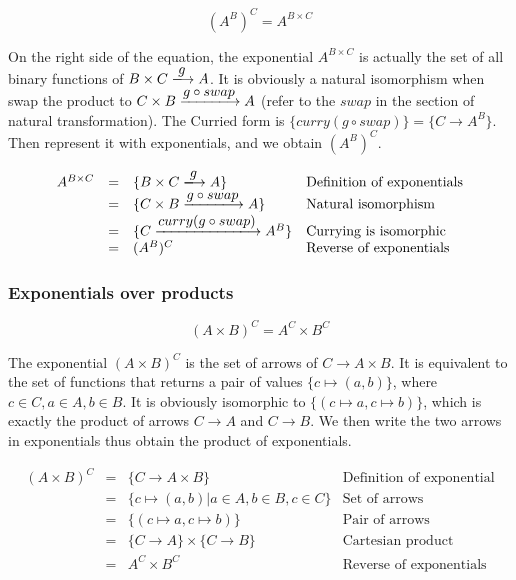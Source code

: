 \documentclass{article}
\begin{document}
\[
  (A^B)^C = A^{B \times C}
\]

On the right side of the equation, the exponential $A^{B \times C}$ is actually the set of all binary functions of $B \times C \arrowto{g} A$. It is obviously a natural isomorphism when swap the product to $C \times B \arrowto{g \circ swap} A$ (refer to the $swap$ in the section of natural transformation). The Curried form is $\{curry(g \circ swap)\} = \{C \to A^B\}$. Then represent it with exponentials, and we obtain $(A^B)^C$.

\[
\begin{array}{rcll}
A^{B \times C} & = & \{B \times C \arrowto{g} A \}  & \text{Definition of exponentials} \\
    & = & \{ C \times B \arrowto{g \circ swap} A \} & \text{Natural isomorphism} \\
    & = & \{ C \arrowto{curry(g \circ swap)} A^B \} & \text{Currying is isomorphic} \\
    & = & (A^B)^C & \text{Reverse of exponentials} \\
\end{array}
\]

\subsubsection{Exponentials over products}

\[
  (A \times B)^C = A^C \times B^C
\]

The exponential $(A \times B)^C$ is the set of arrows of $C \to A \times B$. It is equivalent to the set of functions that returns a pair of values $\{ c \mapsto (a, b)\}$, where $c \in C, a \in A, b \in B$. It is obviously isomorphic to $\{(c \mapsto a, c \mapsto b)\}$, which is exactly the product of arrows $C \to A$ and $C \to B$. We then write the two arrows in exponentials thus obtain the product of exponentials.

\[
\begin{array}{rcll}
(A \times B)^C & = & \{C \to A \times B \}  & \text{Definition of exponential} \\
    & = & \{ c \mapsto (a, b) | a \in A, b \in B, c \in C\} & \text{Set of arrows} \\
    & = & \{ (c \mapsto a, c \mapsto b) \} & \text{Pair of arrows} \\
    & = & \{C \to A\} \times \{C \to B\} & \text{Cartesian product} \\
    & = & A^C \times B^C & \text{Reverse of exponentials} \\
\end{array}
\]
\end{document}
